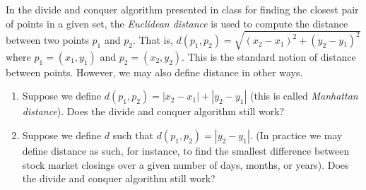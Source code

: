 In the divide and conquer algorithm presented in class for finding the 
closest pair of points in a given set, the
{\em Euclidean distance} is used to
compute the distance between two points $p_{1}$ and $p_{2}$.  That is,
$d(p_{1},p_{2})=\sqrt{(x_{2}-x_{1})^2+(y_{2}-y{_1})^2}$ where
$p_{1}=(x_{1},y_{1})$ and $p_{2}=(x_{2},y_{2})$.  This is the standard notion
of distance between points.  However, we may also define distance in other
ways.

\begin{enumerate}

\item  Suppose we define $d(p_{1},p_{2}) = |x_{2}-x_{1}| +
|y_{2}-y_{1}|$ (this is called {\em Manhattan distance}).  Does the
divide and conquer algorithm still work?

\item  Suppose we define $d$ such that $d(p_{1},p_{2})=|y_{2}-y_{1}|$.
(In practice we may define distance as such, for instance, to find the
smallest difference between stock market closings over a given number
of days, months, or years).  Does the divide and conquer algorithm
still work?

\end{enumerate}
